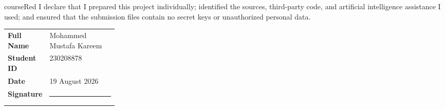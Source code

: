 \documentclass[11pt,a4paper]{article}
\begin{document}
\begin{projectbox}{courseRed}
I declare that I prepared this project individually; identified the sources,
third-party code, and artificial intelligence assistance I used; and ensured that
the submission files contain no secret keys or unauthorized personal data.
\end{projectbox}

\vspace{6mm}
\begin{tabularx}{\linewidth}{@{}L{0.25\linewidth}Y@{}}
\textbf{Full Name} & Mohammed Mustafa Kareem \\
\textbf{Student ID} & 230208878 \\
\textbf{Date} & 19 August 2026 \\
\textbf{Signature} & \rule{\linewidth}{0.4pt} \\
\end{tabularx}
\end{document}
